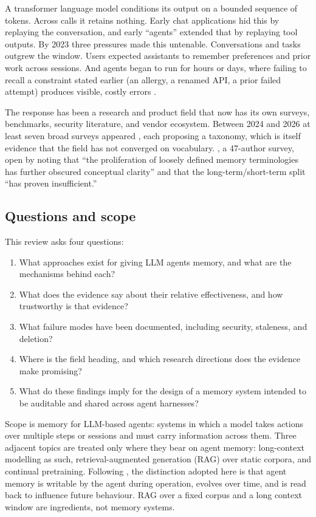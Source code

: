 \documentclass[11pt]{article}
\begin{document}
A transformer language model conditions its output on a bounded sequence of tokens. Across calls it retains nothing. Early chat applications hid this by replaying the conversation, and early ``agents'' extended that by replaying tool outputs. By 2023 three pressures made this untenable. Conversations and tasks outgrew the window. Users expected assistants to remember preferences and prior work across sessions. And agents began to run for hours or days, where failing to recall a constraint stated earlier (an allergy, a renamed API, a prior failed attempt) produces visible, costly errors \citep{zhao2026amabench,wu2026proactive}.

The response has been a research and product field that now has its own surveys, benchmarks, security literature, and vendor ecosystem. Between 2024 and 2026 at least seven broad surveys appeared \citep{zhang2024survey,du2025rethinking,wu2025humanmemory,hu2025memoryage,du2026memory,jiang2026anatomy,luo2026storage}, each proposing a taxonomy, which is itself evidence that the field has not converged on vocabulary. \citet{hu2025memoryage}, a 47-author survey, open by noting that ``the proliferation of loosely defined memory terminologies has further obscured conceptual clarity'' and that the long-term/short-term split ``has proven insufficient.''

\subsection{Questions and scope}

This review asks four questions:
\begin{enumerate}
\item What approaches exist for giving LLM agents memory, and what are the mechanisms behind each?
\item What does the evidence say about their relative effectiveness, and how trustworthy is that evidence?
\item What failure modes have been documented, including security, staleness, and deletion?
\item Where is the field heading, and which research directions does the evidence make promising?
\item What do these findings imply for the design of a memory system intended to be auditable and shared across agent harnesses?
\end{enumerate}

Scope is memory for LLM-based agents: systems in which a model takes actions over multiple steps or sessions and must carry information across them. Three adjacent topics are treated only where they bear on agent memory: long-context modelling as such, retrieval-augmented generation (RAG) over static corpora, and continual pretraining. Following \citet{hu2025memoryage}, the distinction adopted here is that agent memory is writable by the agent during operation, evolves over time, and is read back to influence future behaviour. RAG over a fixed corpus and a long context window are ingredients, not memory systems.
\end{document}
